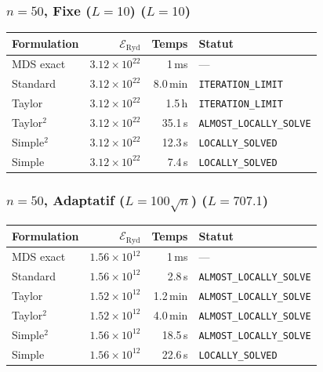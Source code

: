 \subsubsection{$n=50$, Fixe ($L{=}10$) ($L=10$)}
\begin{longtable}{@{}lrrl@{}}
  \toprule
  Formulation & $\mathcal{E}_{\mathrm{Ryd}}$ & Temps & Statut \\
  \midrule
  \endhead
  MDS exact & $3.12\times10^{22}$ & 1\,ms & --- \\
  Standard & $3.12\times10^{22}$ & 8.0\,min & \texttt{ITERATION\_LIMIT} \\
  Taylor & $3.12\times10^{22}$ & 1.5\,h & \texttt{ITERATION\_LIMIT} \\
  Taylor$^2$ & $3.12\times10^{22}$ & 35.1\,s & \texttt{ALMOST\_LOCALLY\_SOLVE} \\
  Simple$^2$ & $3.12\times10^{22}$ & 12.3\,s & \texttt{LOCALLY\_SOLVED} \\
  Simple & $3.12\times10^{22}$ & 7.4\,s & \texttt{LOCALLY\_SOLVED} \\
  \bottomrule
\end{longtable}

\subsubsection{$n=50$, Adaptatif ($L{=}100\sqrt{n}$) ($L=707.1$)}
\begin{longtable}{@{}lrrl@{}}
  \toprule
  Formulation & $\mathcal{E}_{\mathrm{Ryd}}$ & Temps & Statut \\
  \midrule
  \endhead
  MDS exact & $1.56\times10^{12}$ & 1\,ms & --- \\
  Standard & $1.56\times10^{12}$ & 2.8\,s & \texttt{ALMOST\_LOCALLY\_SOLVE} \\
  Taylor & $1.52\times10^{12}$ & 1.2\,min & \texttt{ALMOST\_LOCALLY\_SOLVE} \\
  Taylor$^2$ & $1.52\times10^{12}$ & 4.0\,min & \texttt{ALMOST\_LOCALLY\_SOLVE} \\
  Simple$^2$ & $1.56\times10^{12}$ & 18.5\,s & \texttt{ALMOST\_LOCALLY\_SOLVE} \\
  Simple & $1.56\times10^{12}$ & 22.6\,s & \texttt{LOCALLY\_SOLVED} \\
  \bottomrule
\end{longtable}

